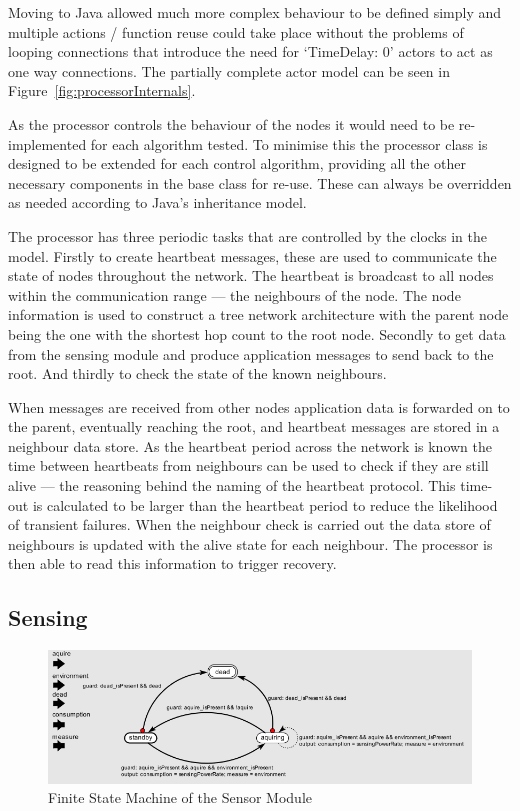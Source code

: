 \documentclass[authoryearcitations]{UoYCSproject}
\begin{document}
Moving to Java allowed much more complex behaviour to be defined simply and multiple actions / function reuse could take place without the problems of looping connections that introduce the need for `TimeDelay: 0' actors to act as one way connections. The partially complete actor model can be seen in Figure~\ref{fig:processorInternals}.

As the processor controls the behaviour of the nodes it would need to be re-implemented for each algorithm tested. To minimise this the processor class is designed to be extended for each control algorithm, providing all the other necessary components in the base class for re-use. These can always be overridden as needed according to Java's inheritance model.

The processor has three periodic tasks that are controlled by the clocks in the model. Firstly to create heartbeat messages, these are used to communicate the state of nodes throughout the network. The heartbeat is broadcast to all nodes within the communication range --- the neighbours of the node. The node information is used to construct a tree network architecture with the parent node being the one with the shortest hop count to the root node. Secondly to get data from the sensing module and produce application messages to send back to the root. And thirdly to check the state of the known neighbours.

When messages are received from other nodes application data is forwarded on to the parent, eventually reaching the root, and heartbeat messages are stored in a neighbour data store. As the heartbeat period across the network is known the time between heartbeats from neighbours can be used to check if they are still alive --- the reasoning behind the naming of the heartbeat protocol. This time-out is calculated to be larger than the heartbeat period to reduce the likelihood of transient failures. When the neighbour check is carried out the data store of neighbours is updated with the alive state for each neighbour. The processor is then able to read this information to trigger recovery.

\subsection{Sensing}

\begin{figure}
 \centering
    \includegraphics[width=\textwidth]{figures/sensor_Controller.png}
    \caption{Finite State Machine of the Sensor Module}
    \label{fig:sensorControl}
\end{figure}
\end{document}
